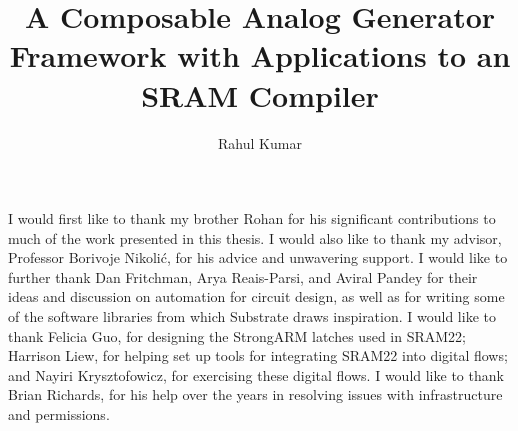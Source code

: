 \documentclass[masters]{ucbthesis}
\begin{document}

\title{A Composable Analog Generator Framework with Applications to an SRAM Compiler}
\author{Rahul Kumar}


\maketitle
\approvalpage
\copyrightpage



\begin{frontmatter}


\tableofcontents
\clearpage
\listoffigures
\clearpage
\listoftables

\begin{acknowledgements}

I would first like to thank my brother Rohan for his significant contributions
to much of the work presented in this thesis. I would also like to thank
my advisor, Professor Borivoje Nikoli\'{c}, for his advice and unwavering support.
I would like to further thank Dan Fritchman, Arya Reais-Parsi, and Aviral Pandey
for their ideas and discussion on automation for circuit design, as well as for
writing some of the software libraries from which Substrate draws inspiration.
I would like to thank Felicia Guo, for designing the StrongARM latches used in SRAM22;
Harrison Liew, for helping set up tools for integrating SRAM22 into digital flows; and
Nayiri Krysztofowicz, for exercising these digital flows.
I would like to thank Brian Richards, for his help over the years in resolving
issues with infrastructure and permissions.

\end{acknowledgements}

\end{frontmatter}
\end{document}
